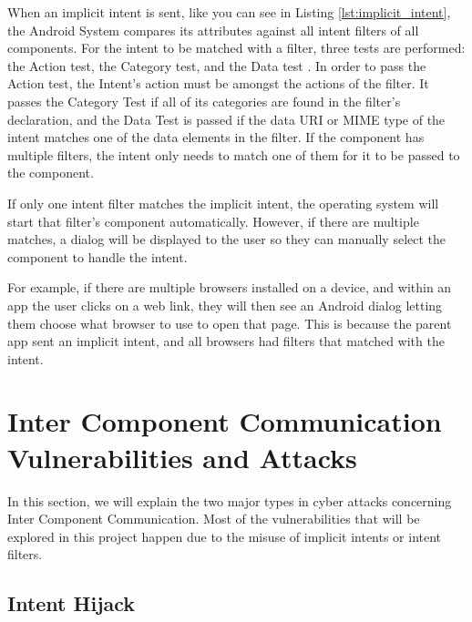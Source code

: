     When an implicit intent is sent, like you can see in Listing \ref{lst:implicit_intent}, the Android System compares its attributes against all intent filters of all components. For the intent to be matched with a filter, three tests are performed: the Action test, the Category test, and the Data test \cite{intents_and_intent_filters}. In order to pass the Action test, the Intent’s action must be amongst the actions of the filter. It passes the Category Test if all of its categories are found in the filter’s declaration, and the Data Test is passed if the data URI or MIME type of the intent matches one of the data elements in the filter. If the component has multiple filters, the intent only needs to match one of them for it to be passed to the component.
    
    
    
    If only one intent filter matches the implicit intent, the operating system will start that filter’s component automatically. However, if there are multiple matches, a dialog will be displayed to the user so they can manually select the component to handle the intent.
    
    For example, if there are multiple browsers installed on a device, and within an app the user clicks on a web link, they will then see an Android dialog letting them choose what browser to use to open that page. This is because the parent app sent an implicit intent, and all browsers had filters that matched with the intent.
    
    \section{Inter Component Communication Vulnerabilities and Attacks}
        \label{sec:icc_vulnerabilities_and_attacks}
        
    In this section, we will explain the two major types in cyber attacks concerning Inter Component Communication. Most of the vulnerabilities that will be explored in this project happen due to the misuse of implicit intents or intent filters.
    
    \subsection{Intent Hijack}
        \label{subsec:intent_hijack}
        
